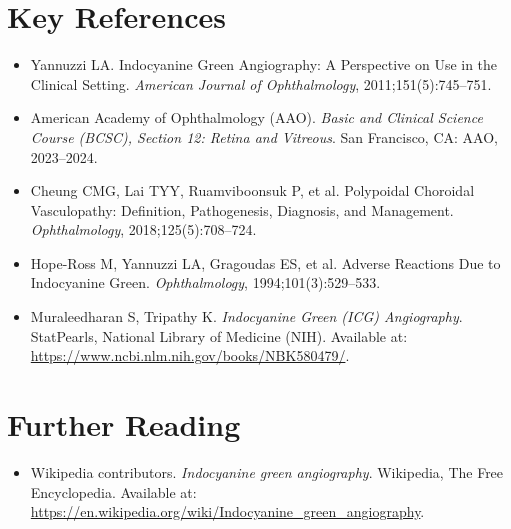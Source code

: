 \section{Key References}

\begin{itemize}
    \item Yannuzzi LA. Indocyanine Green Angiography: A Perspective on Use in the Clinical Setting. \textit{American Journal of Ophthalmology}, 2011;151(5):745--751.
    \item American Academy of Ophthalmology (AAO). \textit{Basic and Clinical Science Course (BCSC), Section 12: Retina and Vitreous}. San Francisco, CA: AAO, 2023--2024.
    \item Cheung CMG, Lai TYY, Ruamviboonsuk P, et al. Polypoidal Choroidal Vasculopathy: Definition, Pathogenesis, Diagnosis, and Management. \textit{Ophthalmology}, 2018;125(5):708--724.
    \item Hope-Ross M, Yannuzzi LA, Gragoudas ES, et al. Adverse Reactions Due to Indocyanine Green. \textit{Ophthalmology}, 1994;101(3):529--533.
    \item Muraleedharan S, Tripathy K. \textit{Indocyanine Green (ICG) Angiography}. StatPearls, National Library of Medicine (NIH). Available at: \url{https://www.ncbi.nlm.nih.gov/books/NBK580479/}.
\end{itemize}

\section{Further Reading}
\begin{itemize}
  \item Wikipedia contributors. \textit{Indocyanine green angiography}. Wikipedia, The Free Encyclopedia. Available at: \url{https://en.wikipedia.org/wiki/Indocyanine_green_angiography}.
\end{itemize}
